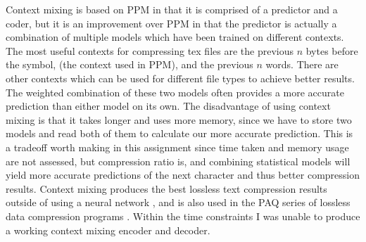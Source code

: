 \documentclass[a4paper, 11pt]{article}
\numberwithin{equation}{section}
\theoremstyle{plain}
\theoremstyle{definition}
\begin{document}
Context mixing is based on PPM in that it is comprised of a predictor and a coder, but it is an improvement 
over PPM in that the predictor is actually a combination of multiple models which have been trained on 
different contexts. 
The most useful contexts for compressing tex files are the previous $n$ bytes before the symbol, 
(the context used in PPM), and the previous $n$ words. 
There are other contexts which can be used for different file types to achieve better results. 
The weighted combination of these two models often provides a more accurate prediction than either 
model on its own. 
The disadvantage of using context mixing is that it takes longer and uses more memory, since we have to 
store two models and read both of them to calculate our more accurate prediction. 
This is a tradeoff worth making in this assignment since time taken and memory usage are not assessed, but 
compression ratio is, and combining statistical models will yield more accurate predictions of the next 
character and thus better compression results. 
Context mixing produces the best lossless text compression results outside of using a neural network \cite{TextBenchmark}, 
and is also used in the PAQ series of lossless data compression programs \cite{TextCompression}. 
Within the time constraints I was unable to produce a working context mixing encoder and decoder. 




\end{document}
